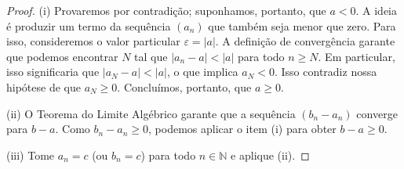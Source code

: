 \begin{proof}
(i) Provaremos por contradição; suponhamos, portanto, que $a < 0$. A ideia é produzir um termo da sequência $(a_n)$ que também seja menor que zero. Para isso, consideremos o valor particular $\varepsilon = |a|$. A definição de convergência garante que podemos encontrar $N$ tal que $|a_n - a| < |a|$ para todo $n \geq N$. Em particular, isso significaria que $|a_N - a| < |a|$, o que implica $a_N < 0$. Isso contradiz nossa hipótese de que $a_N \geq 0$. Concluímos, portanto, que $a \geq 0$. 

\begin{center}
\end{center}

(ii) O Teorema do Limite Algébrico garante que a sequência $(b_n - a_n)$ converge para $b - a$. Como $b_n - a_n \geq 0$, podemos aplicar o item (i) para obter $b - a \geq 0$.

(iii) Tome $a_n = c$ (ou $b_n = c$) para todo $n \in \mathbb{N}$ e aplique (ii).
\end{proof}

